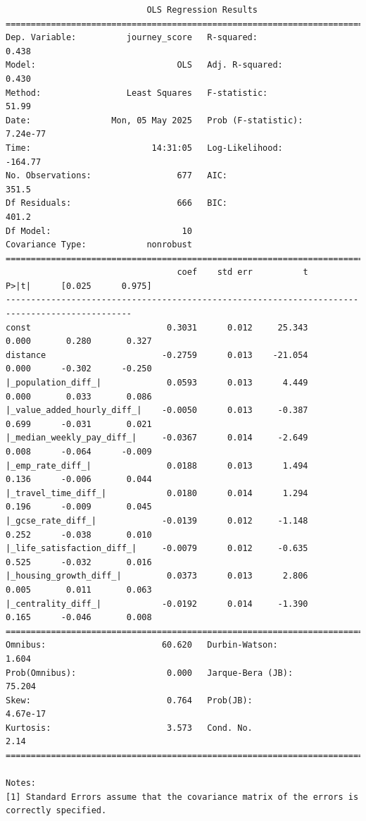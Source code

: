 \documentclass[
  number]{elsarticle}
\begin{document}
\begin{verbatim}
                            OLS Regression Results                            
==============================================================================
Dep. Variable:          journey_score   R-squared:                       0.438
Model:                            OLS   Adj. R-squared:                  0.430
Method:                 Least Squares   F-statistic:                     51.99
Date:                Mon, 05 May 2025   Prob (F-statistic):           7.24e-77
Time:                        14:31:05   Log-Likelihood:                -164.77
No. Observations:                 677   AIC:                             351.5
Df Residuals:                     666   BIC:                             401.2
Df Model:                          10                                         
Covariance Type:            nonrobust                                         
===============================================================================================
                                  coef    std err          t      P>|t|      [0.025      0.975]
-----------------------------------------------------------------------------------------------
const                           0.3031      0.012     25.343      0.000       0.280       0.327
distance                       -0.2759      0.013    -21.054      0.000      -0.302      -0.250
|_population_diff_|             0.0593      0.013      4.449      0.000       0.033       0.086
|_value_added_hourly_diff_|    -0.0050      0.013     -0.387      0.699      -0.031       0.021
|_median_weekly_pay_diff_|     -0.0367      0.014     -2.649      0.008      -0.064      -0.009
|_emp_rate_diff_|               0.0188      0.013      1.494      0.136      -0.006       0.044
|_travel_time_diff_|            0.0180      0.014      1.294      0.196      -0.009       0.045
|_gcse_rate_diff_|             -0.0139      0.012     -1.148      0.252      -0.038       0.010
|_life_satisfaction_diff_|     -0.0079      0.012     -0.635      0.525      -0.032       0.016
|_housing_growth_diff_|         0.0373      0.013      2.806      0.005       0.011       0.063
|_centrality_diff_|            -0.0192      0.014     -1.390      0.165      -0.046       0.008
==============================================================================
Omnibus:                       60.620   Durbin-Watson:                   1.604
Prob(Omnibus):                  0.000   Jarque-Bera (JB):               75.204
Skew:                           0.764   Prob(JB):                     4.67e-17
Kurtosis:                       3.573   Cond. No.                         2.14
==============================================================================

Notes:
[1] Standard Errors assume that the covariance matrix of the errors is correctly specified.
\end{verbatim}
\end{document}
